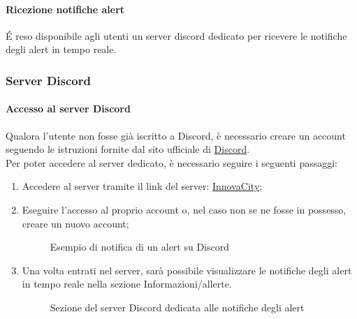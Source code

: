 \paragraph{Ricezione notifiche alert}
É reso disponibile agli utenti un server discord dedicato per ricevere le notifiche degli alert in tempo reale. \\


\subsubsection{Server Discord}

\paragraph{Accesso al server Discord}
Qualora l'utente non fosse già iscritto a Discord, è necessario creare un account seguendo le istruzioni fornite dal sito ufficiale di \href{https://discord.com/}{Discord}. \\
Per poter accedere al server dedicato, è necessario seguire i seguenti passaggi:
\begin{enumerate}
    \item Accedere al server tramite il link del server: \href{https://discord.gg/9VZ8me7x}{InnovaCity};
    \item Eseguire l'accesso al proprio account o, nel caso non se ne fosse in possesso, creare un nuovo account;
    \begin{figure}[H]
        \centering
        \caption{Esempio di notifica di un alert su Discord}
        \label{fig:my_label}
    \end{figure}
    \item Una volta entrati nel server, sarà possibile visualizzare le notifiche degli alert in tempo reale nella sezione Informazioni/allerte. 
    \begin{figure}[H]
        \centering
        \caption{Sezione del server Discord dedicata alle notifiche degli alert}    
        \label{fig:my_label}
    \end{figure}
\end{enumerate}

